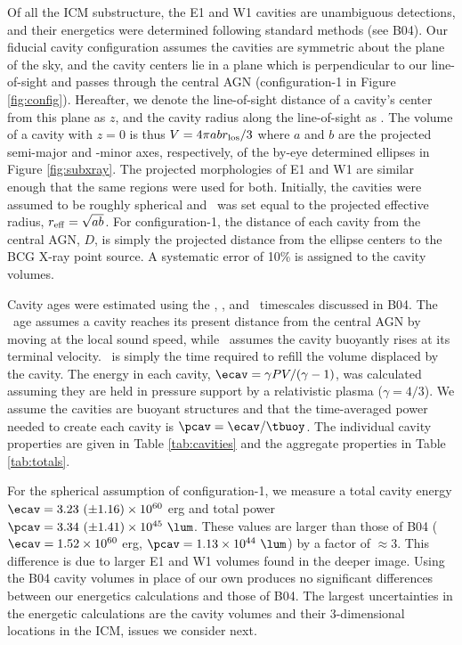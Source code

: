 \documentclass[11pt, preprint]{aastex}
\begin{document}
Of all the ICM substructure, the E1 and W1 cavities are unambiguous
detections, and their energetics were determined following standard
methods (see B04). Our fiducial cavity configuration assumes the
cavities are symmetric about the plane of the sky, and the cavity
centers lie in a plane which is perpendicular to our line-of-sight and
passes through the central AGN (configuration-1 in Figure
\ref{fig:config}). Hereafter, we denote the line-of-sight distance of
a cavity's center from this plane as $z$, and the cavity radius along
the line-of-sight as \rlos. The volume of a cavity with $z = 0$ is
thus $V = 4\pi a b r_{\rm{los}}/3$ where $a$ and $b$ are the projected
semi-major and -minor axes, respectively, of the by-eye determined
ellipses in Figure \ref{fig:subxray}. The projected morphologies of E1
and W1 are similar enough that the same regions were used for
both. Initially, the cavities were assumed to be roughly spherical and
\rlos\ was set equal to the projected effective radius, $r_{\rm{eff}} =
\sqrt{ab}$. For configuration-1, the distance of each cavity from the
central AGN, $D$, is simply the projected distance from the ellipse
centers to the BCG X-ray point source. A systematic error of 10\% is
assigned to the cavity volumes.

Cavity ages were estimated using the \tsonic, \tbuoy, and
\trefill\ timescales discussed in B04. The \tsonic\ age assumes a
cavity reaches its present distance from the central AGN by moving at
the local sound speed, while \tbuoy\ assumes the cavity buoyantly
rises at its terminal velocity. \trefill\ is simply the time required
to refill the volume displaced by the cavity. The energy in each
cavity, $\ecav = \gamma PV/(\gamma-1)$, was calculated assuming they
are held in pressure support by a relativistic plasma ($\gamma =
4/3$). We assume the cavities are buoyant structures and that the
time-averaged power needed to create each cavity is $\pcav =
\ecav/\tbuoy$. The individual cavity properties are given in Table
\ref{tab:cavities} and the aggregate properties in Table
\ref{tab:totals}.

For the spherical assumption of configuration-1, we measure a total
cavity energy $\ecav = 3.23 ~(\pm 1.16) \times 10^{60}$ erg and total
power $\pcav = 3.34 ~(\pm 1.41) \times 10^{45} ~\lum$. These values
are larger than those of B04 ($\ecav = 1.52 \times 10^{60}$ erg,
$\pcav = 1.13 \times 10^{44} ~\lum$) by a factor of $\approx 3$. This
difference is due to larger E1 and W1 volumes found in the deeper
image. Using the B04 cavity volumes in place of our own produces no
significant differences between our energetics calculations and those
of B04. The largest uncertainties in the energetic calculations are
the cavity volumes and their 3-dimensional locations in the ICM,
issues we consider next.
\end{document}
